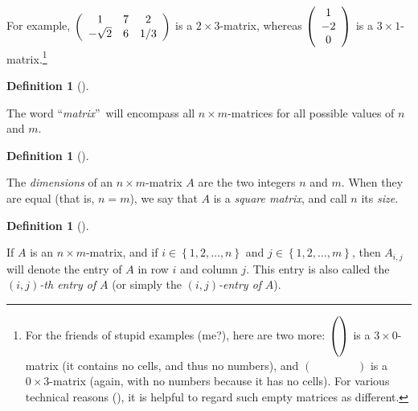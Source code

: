 \documentclass[numbers=enddot,12pt,final,onecolumn,notitlepage]{scrartcl}%
\theoremstyle{definition}
\newtheorem{defi}[theo]{Definition}
\newenvironment{definition}[1][]
{\begin{defi}[#1]\begin{leftbar}}
{\end{leftbar}\end{defi}}
\begin{document}
For example, $\left(
\begin{array}
[c]{ccc}%
1 & 7 & 2\\
-\sqrt{2} & 6 & 1/3
\end{array}
\right)  $ is a $2\times3$-matrix, whereas $\left(
\begin{array}
[c]{c}%
1\\
-2\\
0
\end{array}
\right)  $ is a $3\times1$-matrix.\footnote{For the friends of stupid examples
(me?), here are two more: $\left(
\vphantom{\begin{array}{c} a \\ a \\ a \end{array}}\right)  $ is a $3\times
0$-matrix (it contains no cells, and thus no numbers), and $\left(
\phantom{\begin{array}{ccc} a & a & a \end{array}}\right)  $ is a $0\times
3$-matrix (again, with no numbers because it has no cells). For various
technical reasons (\cite{deBoor}), it is helpful to regard such empty matrices
as different.}

\begin{definition}
The word \textquotedblleft\textit{matrix}\textquotedblright\ will encompass
all $n\times m$-matrices for all possible values of $n$ and $m$.
\end{definition}

\begin{definition}
The \textit{dimensions} of an $n\times m$-matrix $A$ are the two integers $n$
and $m$. When they are equal (that is, $n=m$), we say that $A$ is a
\textit{square matrix}, and call $n$ its \textit{size}.
\end{definition}

\begin{definition}
If $A$ is an $n\times m$-matrix, and if $i\in\left\{  1,2,\ldots,n\right\}  $
and $j\in\left\{  1,2,\ldots,m\right\}  $, then $A_{i,j}$ will denote the
entry of $A$ in row $i$ and column $j$. This entry is also called the $\left(
i,j\right)  $\textit{-th entry of }$A$ (or simply the $\left(  i,j\right)
$\textit{-entry of }$A$).
\end{definition}
\end{document}
